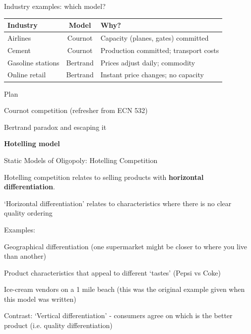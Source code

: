 \documentclass[notes,11pt, aspectratio=169]{beamer}
\newenvironment{wideitemize}{\itemize\addtolength{\itemsep}{10pt}}{\enditemize}
\newenvironment{wideenumerate}{\enumerate\addtolength{\itemsep}{10pt}}{\endenumerate}
\begin{document}
\begin{frame}{Industry examples: which model?}
	\begin{center}
	\begin{tabular}{|l|c|l|}
		\hline
		\textbf{Industry} & \textbf{Model} & \textbf{Why?} \\
		\hline
		Airlines & \pause Cournot & Capacity (planes, gates) committed \\
		\hline \pause
		Cement & \pause Cournot & Production committed; transport costs \\
		\hline \pause
		Gasoline stations & \pause Bertrand & Prices adjust daily; commodity \\
		\hline \pause
		Online retail & \pause Bertrand & Instant price changes; no capacity \\
		\hline
	\end{tabular}
	\end{center}
\end{frame}


\begin{frame}{Plan}
  \begin{wideenumerate}
    \item Cournot competition (refresher from ECN 532)
    \item Bertrand paradox and escaping it
    \item \textbf{Hotelling model}
  \end{wideenumerate}
\end{frame}

\begin{frame}{Static Models of Oligopoly: Hotelling Competition}
	\begin{wideitemize}
		\item Hotelling competition relates to selling products with \textbf{horizontal differentiation}.
		\item `Horizontal differentiation' relates to characteristics where there is no clear quality ordering
		\item Examples:
		\begin{wideitemize}
			\item Geographical differentiation (one supermarket might be closer to where you live than another)
			\item Product characteristics that appeal to different `tastes' (Pepsi vs Coke)
			\item Ice-cream vendors on a 1 mile beach (this was the original example given when this model was written)
		\end{wideitemize}
		\item Contrast: `Vertical differentiation' - consumers agree on which is the better product (i.e. quality differentiation)
	\end{wideitemize}
\end{frame}
\end{document}
